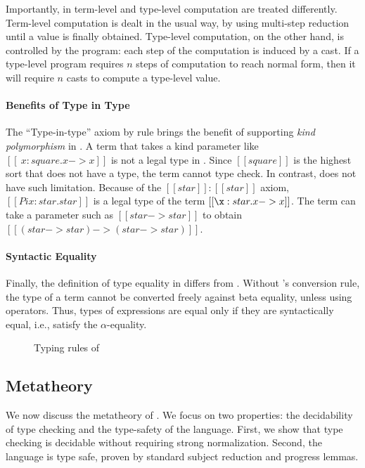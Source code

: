 Importantly, in \ecore term-level and type-level computation are treated 
differently. Term-level computation is dealt in the usual way, by 
using multi-step reduction until a value is finally obtained. 
Type-level computation, on the other hand, is controlled by the program:
each step of the computation is induced by a cast. If a type-level 
program requires $n$ steps of computation to reach normal form, 
then it will require $n$ casts to compute a type-level value.

\paragraph{Benefits of Type in Type}
The ``Type-in-type'' axiom by rule  brings the benefit 
of supporting \emph{kind polymorphism} in \ecore.
A term that takes a kind parameter like $[[\
    x:square.x->x]]$ is not a legal type in \cc. Since $[[square]]$ is
the highest sort that does not have a type, the term cannot type check.
In contrast, \ecore does not have such limitation. Because of
the $[[star]]:[[star]]$ axiom, $[[Pi x:star.star]]$ is 
a legal type of the term $[[\x:star.x->x]]$. The term can take 
a parameter such as $[[star -> star]]$
to obtain $[[(star->star) -> (star -> star)]]$.

\paragraph{Syntactic Equality}
Finally, the definition of type equality in \ecore differs from
\cc. Without \cc's conversion rule, the type of a term cannot be
converted freely against beta equality, unless using \cast
operators. Thus, types of expressions are equal only if they are
syntactically equal, i.e., satisfy the $\alpha$-equality.

\begin{figure}
    \ottdefnctx{}\ottinterrule
    \ottdefnexpr{}
    \caption{Typing rules of \ecore}
    \label{fig:ecore:typing}
\end{figure}

\subsection{Metatheory}\label{sec:ecore:meta}
We now discuss the metatheory of \ecore. We focus on two properties:
the decidability of type checking and the type-safety of the
language. First, we show that type checking \ecore is decidable
without requiring strong normalization. Second, the language is type
safe, proven by standard subject reduction and progress lemmas.

